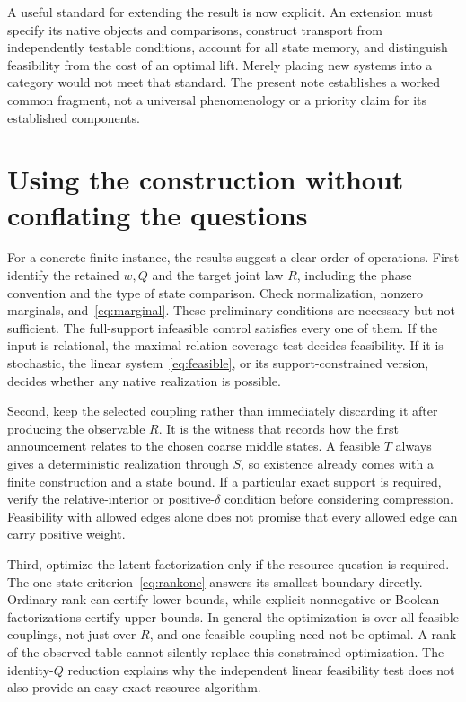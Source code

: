 \documentclass[11pt]{article}
\theoremstyle{remark}
\begin{document}
A useful standard for extending the result is now explicit. An extension must specify its native objects and comparisons, construct transport from independently testable conditions, account for all state memory, and distinguish feasibility from the cost of an optimal lift. Merely placing new systems into a category would not meet that standard. The present note establishes a worked common fragment, not a universal phenomenology or a priority claim for its established components.

\section{Using the construction without conflating the questions}

For a concrete finite instance, the results suggest a clear order of operations. First identify the retained $w,Q$ and the target joint law $R$, including the phase convention and the type of state comparison. Check normalization, nonzero marginals, and~\eqref{eq:marginal}. These preliminary conditions are necessary but not sufficient. The full-support infeasible control satisfies every one of them. If the input is relational, the maximal-relation coverage test decides feasibility. If it is stochastic, the linear system~\eqref{eq:feasible}, or its support-constrained version, decides whether any native realization is possible.

Second, keep the selected coupling rather than immediately discarding it after producing the observable $R$. It is the witness that records how the first announcement relates to the chosen coarse middle states. A feasible $T$ always gives a deterministic realization through $S$, so existence already comes with a finite construction and a state bound. If a particular exact support is required, verify the relative-interior or positive-$\delta$ condition before considering compression. Feasibility with allowed edges alone does not promise that every allowed edge can carry positive weight.

Third, optimize the latent factorization only if the resource question is required. The one-state criterion~\eqref{eq:rankone} answers its smallest boundary directly. Ordinary rank can certify lower bounds, while explicit nonnegative or Boolean factorizations certify upper bounds. In general the optimization is over all feasible couplings, not just over $R$, and one feasible coupling need not be optimal. A rank of the observed table cannot silently replace this constrained optimization. The identity-$Q$ reduction explains why the independent linear feasibility test does not also provide an easy exact resource algorithm.
\end{document}
